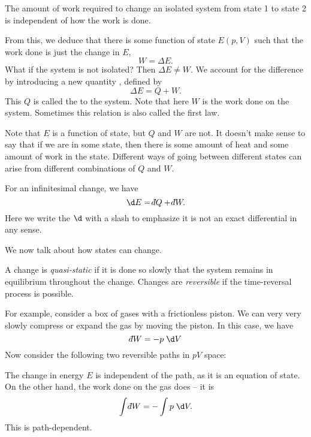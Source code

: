 \documentclass[a4paper]{article}
\def\di{{\mathchar'26\mkern-12mu d}}
\begin{document}
\begin{law}
  The amount of work required to change an isolated system from state 1 to state 2 is independent of how the work is done.
\end{law}

From this, we deduce that there is some function of state $E(p, V)$ such that the work done is just the change in $E$,
\[
  W = \Delta E.
\]
What if the system is not isolated? Then $\Delta E \not= W$. We account for the difference by introducing a new quantity , defined by
\[
  \Delta E = Q + W.
\]
This $Q$ is called the  to the system. Note that here $W$ is the work done on the system. Sometimes this relation is also called the first law.

Note that $E$ is a function of state, but $Q$ and $W$ are not. It doesn't make sense to say that if we are in some state, then there is some amount of heat and some amount of work in the state. Different ways of going between different states can arise from different combinations of $Q$ and $W$.

For an infinitesimal change, we have
\[
  \d E = \di Q + \di W.
\]
Here we write the $\d$ with a slash to emphasize it is not an exact differential in any sense.

We now talk about how states can change.
\begin{defi}
  A change is \emph{quasi-static} if it is done so slowly that the system remains in equilibrium throughout the change. Changes are \emph{reversible} if the time-reversal process is possible.
\end{defi}
For example, consider a box of gases with a frictionless piston. We can very very slowly compress or expand the gas by moving the piston. In this case, we have
\[
  \di W = - p \;\d V
\]
Now consider the following two reversible paths in $pV$ space:
\begin{center}
\end{center}
The change in energy $E$ is independent of the path, as it is an equation of state. On the other hand, the work done on the gas does -- it is
\[
  \int \di W = - \int p\; \d V.
\]
This is path-dependent.
\end{document}
